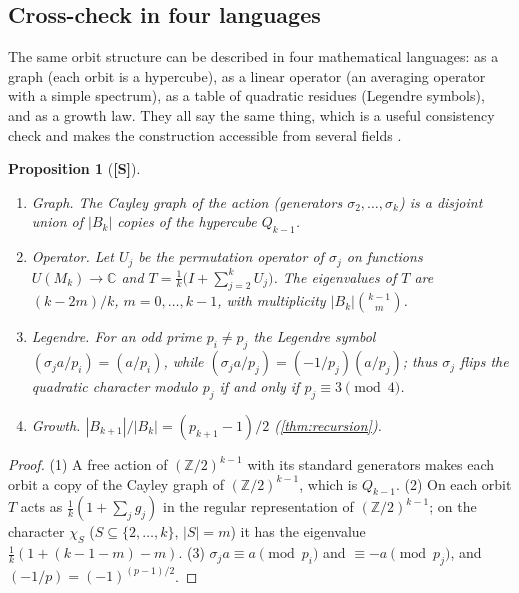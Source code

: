 \documentclass[11pt,a4paper]{article}
\newcommand{\statS}{\textsf{\textbf{[S]}}}
\theoremstyle{plain}
\newtheorem{proposition}[theorem]{Proposition}
\theoremstyle{definition}
\theoremstyle{remark}
\newcommand{\Z}{\mathbb{Z}}
\begin{document}
\subsection{Cross-check in four languages}
\begin{plainwords}
The same orbit structure can be described in four mathematical languages:
as a graph (each orbit is a hypercube), as a linear operator (an averaging
operator with a simple spectrum), as a table of quadratic residues (Legendre
symbols), and as a growth law. They all say the same thing, which is a useful
consistency check and makes the construction accessible from several fields \cite{K-layers}.
\end{plainwords}

\begin{proposition}[\statS]\label{prop:languages}
\begin{enumerate}[itemsep=1pt]
\item \emph{Graph.} The Cayley graph of the action (generators
$\sigma_2,\dots,\sigma_k$) is a disjoint union of $|B_k|$ copies of the
hypercube $Q_{k-1}$.
\item \emph{Operator.} Let $U_j$ be the permutation operator of $\sigma_j$ on
functions $U(M_k)\to\mathbb{C}$ and $T=\frac1k\bigl(I+\sum_{j=2}^kU_j\bigr)$.
The eigenvalues of $T$ are $(k-2m)/k$, $m=0,\dots,k-1$, with multiplicity
$|B_k|\binom{k-1}{m}$.
\item \emph{Legendre.} For an odd prime $p_i\ne p_j$ the Legendre symbol
$(\sigma_j a/p_i)=(a/p_i)$, while $(\sigma_j a/p_j)=(-1/p_j)(a/p_j)$; thus
$\sigma_j$ flips the quadratic character modulo $p_j$ if and only if
$p_j\equiv3\pmod4$.
\item \emph{Growth.} $|B_{k+1}|/|B_k|=(p_{k+1}-1)/2$ (\cref{thm:recursion}).
\end{enumerate}
\end{proposition}
\begin{proof}
(1) A free action of $(\Z/2)^{k-1}$ with its standard generators makes each
orbit a copy of the Cayley graph of $(\Z/2)^{k-1}$, which is $Q_{k-1}$.
(2) On each orbit $T$ acts as $\frac1k(1+\sum_j g_j)$ in the regular
representation of $(\Z/2)^{k-1}$; on the character $\chi_S$
($S\subseteq\{2,\dots,k\}$, $|S|=m$) it has the eigenvalue
$\frac1k(1+(k-1-m)-m)$. (3) $\sigma_ja\equiv a\pmod{p_i}$ and $\equiv-a\pmod{p_j}$,
and $(-1/p)=(-1)^{(p-1)/2}$.
\end{proof}
\end{document}
